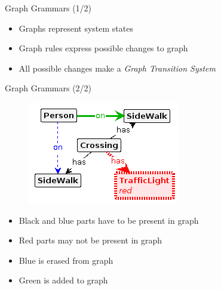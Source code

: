 \documentclass{FMTslides}
\begin{document}
\begin{frame}{Graph Grammars (1/2)}
\begin{figure}
\centering
    \hspace{10px}
\end{figure}

\begin{itemize}[<+->]
  \item Graphs represent system states
  \item Graph rules express possible changes to graph
  \item All possible changes make a \textit{Graph Transition System}
\end{itemize}
\end{frame}

\begin{frame}{Graph Grammars (2/2)}
\begin{figure}
\includegraphics[scale=0.75]{./figures/cross.png}
\end{figure}
\begin{itemize}[<+->]
  \item Black and blue parts have to be present in graph
  \item Red parts may not be present in graph
  \item Blue is erased from graph
  \item Green is added to graph
\end{itemize}
\end{frame}
\end{document}
